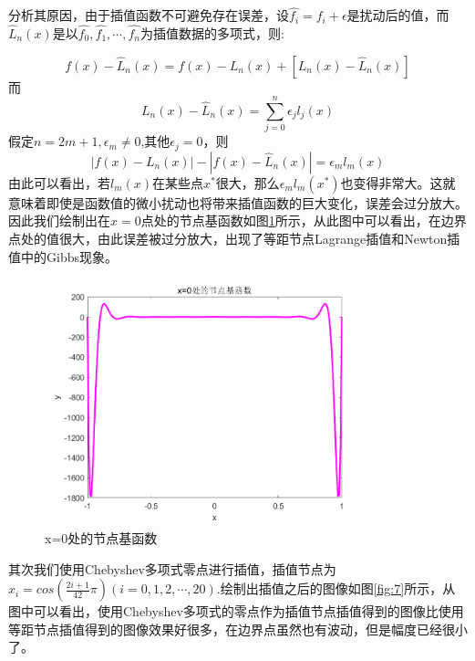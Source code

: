 \documentclass[a4paper]{article}
\begin{document}
分析其原因，由于插值函数不可避免存在误差，设$\hat{f_i}=f_i+\epsilon$是扰动后的值，而$\hat{L}_n(x)$是以$\hat{f_0},\hat{f_1},\cdots,\hat{f_n}$为插值数据的多项式，则:

\begin{equation}
f(x)-\hat{L}_n(x)=f(x)-L_n(x)+[L_n(x)-\hat{L}_n(x)]
\end{equation}
而
\begin{equation}
L_n(x)-\hat{L}_n(x)=\sum_{j=0}^{n}\epsilon_jl_j(x)
\end{equation}
假定$n=2m+1,\epsilon_m\ne 0$,其他$\epsilon_j=0$，则
\begin{equation}
|f(x)-L_n(x)|-|f(x)-\hat{L}_n(x)|=\epsilon_ml_m(x)
\end{equation}
由此可以看出，若$l_m(x)$在某些点$x^*$很大，那么$\epsilon_ml_m(x^*)$也变得非常大。这就意味着即使是函数值的微小扰动也将带来插值函数的巨大变化，误差会过分放大。因此我们绘制出在$x=0$点处的节点基函数如图\ref{fig:6}所示，从此图中可以看出，在边界点处的值很大，由此误差被过分放大，出现了等距节点Lagrange插值和Newton插值中的Gibbs现象。 

\begin{figure}[!h]
	\centering
	\includegraphics[width=0.85\textwidth]{../code/result/base0}
	\caption{\label{fig:6}x=0处的节点基函数}
\end{figure}

其次我们使用Chebyshev多项式零点进行插值，插值节点为$x_i=cos(\frac{2i+1}{42}\pi)(i=0,1,2,\cdots,20)$.绘制出插值之后的图像如图\ref{fig:7}所示，从图中可以看出，使用Chebyshev多项式的零点作为插值节点插值得到的图像比使用等距节点插值得到的图像效果好很多，在边界点虽然也有波动，但是幅度已经很小了。
\end{document}
